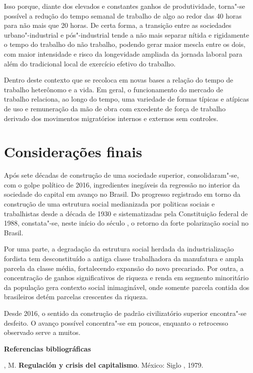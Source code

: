 Isso porque, diante dos elevados e constantes ganhos de produtividade,
torna"-se possível a redução do tempo semanal de trabalho de algo ao
redor das 40 horas para não mais que 20 horas. De certa forma, a
transição entre as sociedades urbano"-industrial e pós"-industrial tende a
não mais separar nítida e rigidamente o tempo do trabalho do não
trabalho, podendo gerar maior mescla entre os dois, com maior
intensidade e risco da longevidade ampliada da jornada laboral para além
do tradicional local de exercício efetivo do trabalho.

Dentro deste contexto que se recoloca em novas bases a relação do tempo
de trabalho heterônomo e a vida. Em geral, o funcionamento do mercado de
trabalho relaciona, ao longo do tempo, uma variedade de formas típicas e
atípicas de uso e remuneração da mão de obra com excedente de força de
trabalho derivado dos movimentos migratórios internos e externos sem
controles.

\section{Considerações finais}

Após sete décadas de construção de uma sociedade superior,
consolidaram"-se, com o golpe político de 2016, ingredientes inegáveis da
regressão no interior da sociedade do capital em avanço no Brasil. Do
progresso registrado em torno da construção de uma estrutura social
medianizada por politicas sociais e trabalhistas desde a década de 1930
e sistematizadas pela Constituição federal de 1988, constata"-se, neste
início do século , o retorno da forte polarização social no Brasil.

Por uma parte, a degradação da estrutura social herdada da
industrialização fordista tem desconstituído a antiga classe
trabalhadora da manufatura e ampla parcela da classe média, fortalecendo
expansão do novo precariado. Por outra, a concentração de ganhos
significativos de riqueza e renda em segmento minoritário da população
gera contexto social inimaginável, onde somente parcela contida dos
brasileiros detém parcelas crescentes da riqueza.

Desde 2016, o sentido da construção de padrão civilizatório superior
encontra"-se desfeito. O avanço possível concentra"-se em poucos, enquanto
o retrocesso observado serve a muitos.

\textbf{Referencias bibliográficas}

, M. \textbf{Regulación y crisis del capitalismo}. México: Siglo
, 1979.

